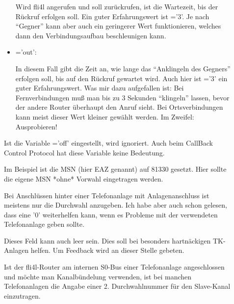 \begin{description}
\begin{itemize}
    Wird fli4l angerufen und soll zurückrufen, ist
     die Wartezeit, bis der Rückruf erfolgen
    soll. Ein guter Erfahrungswert ist \linebreak {}='3'. Je
    nach ``Gegner'' kann aber auch ein geringerer Wert funktionieren,
    welches dann den Verbindungsaufbau beschleunigen kann.

  \item {}='out':
    
    In diesem Fall gibt  die Zeit an, wie lange
    das ``Anklingeln des Gegners'' erfolgen soll, bis auf den Rückruf
    gewartet wird. Auch hier ist ='3' ein guter
    Erfahrungswert. Was mir dazu aufgefallen ist: Bei Fernverbindungen
    muß man bis zu 3 Sekunden ``klingeln'' lassen, bevor der andere
    Router überhaupt den Anruf sieht. Bei Ortsverbindungen kann meist
    dieser Wert kleiner gewählt werden. Im Zweifel: Ausprobieren!
  \end{itemize}

  
  Ist die Variable ='off' eingestellt, wird
  \linebreak {} ignoriert.
  Auch beim CallBack Control Protocol hat diese Variable keine Bedeutung.



  Im Beispiel ist die MSN (hier EAZ genannt) auf 81330 gesetzt. Hier
  sollte die eigene MSN *ohne* Vorwahl eingetragen werden.
  
  Bei Anschlüssen hinter einer Telefonanlage mit Anlagenanschluss ist
  meistens nur die Durchwahl anzugeben. Ich habe aber auch schon
  gelesen, dass eine '0' weiterhelfen kann, wenn es Probleme mit der
  verwendeten Telefonanlage geben sollte.
  
  Dieses Feld kann auch leer sein. Dies
  soll bei besonders hartnäckigen TK-Anlagen helfen. Um Feedback wird
  an dieser Stelle gebeten.

  
  Ist der fli4l-Router am internen S0-Bus einer Telefonanlage
  angeschlossen und möchte man Kanalbündelung verwenden, ist bei
  manchen Telefonanlagen die Angabe einer 2. Durchwahlnummer für den
  Slave-Kanal einzutragen.
  

\end{description}
